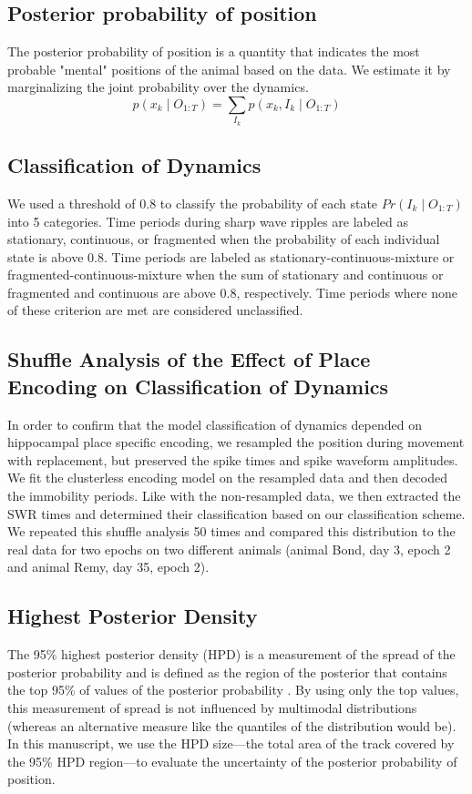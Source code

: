 \documentclass[9pt,lineno]{elife}
\begin{document}
\subsection*{Posterior probability of position}
The posterior probability of position is a quantity that indicates the most probable "mental" positions of the animal based on the data. We estimate it by marginalizing the joint probability over the dynamics.
$$p(x_{k} \mid O_{1:T}) = \sum_{I_{k}} p(x_{k}, I_{k} \mid O_{1:T})$$

\subsection*{Classification of Dynamics}
We used a threshold of 0.8 to classify the probability of each state $Pr(I_{k} \mid O_{1:T})$ into 5 categories. Time periods during sharp wave ripples are labeled as stationary, continuous, or fragmented when the probability of each individual state is above 0.8. Time periods are labeled as stationary-continuous-mixture or fragmented-continuous-mixture when the sum of stationary and continuous or fragmented and continuous are above 0.8, respectively. Time periods where none of these criterion are met are considered unclassified.


\subsection*{Shuffle Analysis of the Effect of Place Encoding on Classification of Dynamics}
In order to confirm that the model classification of dynamics depended on hippocampal place specific encoding, we resampled the position during movement with replacement, but preserved the spike times and spike waveform amplitudes. We fit the clusterless encoding model on the resampled data and then decoded the immobility periods. Like with the non-resampled data, we then extracted the SWR times and determined their classification based on our classification scheme. We repeated this shuffle analysis 50 times and compared this distribution to the real data for two epochs on two different animals (animal Bond, day 3, epoch 2 and animal Remy, day 35, epoch 2).

\subsection*{Highest Posterior Density}
The 95\% highest posterior density (HPD) is a measurement of the spread of the posterior probability and is defined as the region of the posterior that contains the top 95\% of values of the posterior probability \citep{CasellaStatisticalinference2001}. By using only the top values, this measurement of spread is not influenced by multimodal distributions (whereas an alternative measure like the quantiles of the distribution would be). In this manuscript, we use the HPD size---the total area of the track covered by the 95\% HPD region---to evaluate the uncertainty of the posterior probability of position. 
\end{document}
